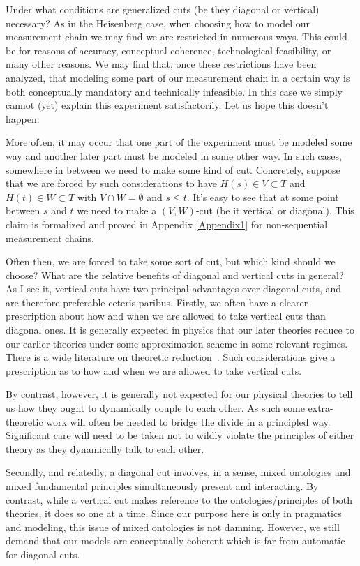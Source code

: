 \documentclass[prd,twocolumn,superscriptaddress,floatfix,amsmath,amssymb,amsfonts,nofootinbib]{revtex4-2}
\begin{document}
Under what conditions are generalized cuts (be they diagonal or vertical) necessary? As in the Heisenberg case, when choosing how to model our measurement chain we may find we are restricted in numerous ways. This could be for reasons of accuracy, conceptual coherence, technological feasibility, or many other reasons. We may find that, once these restrictions have been analyzed, that modeling some part of our measurement chain in a certain way is both conceptually mandatory and technically infeasible. In this case we simply cannot (yet) explain this experiment satisfactorily. Let us hope this doesn't happen.

More often, it may occur that one part of the experiment must be modeled some way and another later part must be modeled in some other way. In such cases, somewhere in between we need to make some kind of cut. Concretely, suppose that we are forced by such considerations to have \mbox{$H(s)\in V\subset T$} and \mbox{$H(t)\in W\subset T$} with $V\cap W=\emptyset$ and $s\leq t$. It's easy to see that at some point between $s$ and $t$ we need to make a $(V,W)$-cut (be it vertical or diagonal). This claim is formalized and proved in Appendix \ref{Appendix1} for non-sequential measurement chains.

Often then, we are forced to take some sort of cut, but which kind should we choose? What are the relative benefits of diagonal and vertical cuts in general? As I see it, vertical cuts have two principal advantages over diagonal cuts, and are therefore preferable ceteris paribus. Firstly, we often have a clearer prescription about how and when we are allowed to take vertical cuts than diagonal ones. It is generally expected in physics that our later theories reduce to our earlier theories under some approximation scheme in some relevant regimes. There is a wide literature on theoretic reduction~\cite{sep-physics-interrelate,Rosaler}. Such considerations give a prescription as to how and when we are allowed to take vertical cuts. 

By contrast, however, it is generally not expected for our physical theories to tell us how they ought to dynamically couple to each other. As such some extra-theoretic work will often be needed to bridge the divide in a principled way. Significant care will need to be taken not to wildly violate the principles of either theory as they dynamically talk to each other.

Secondly, and relatedly, a diagonal cut involves, in a sense, mixed ontologies and mixed fundamental principles simultaneously present and interacting. By contrast, while a vertical cut makes reference to the ontologies/principles of both theories, it does so one at a time. Since our purpose here is only in pragmatics and modeling, this issue of mixed ontologies is not damning. However, we still demand that our models are conceptually coherent which is far from automatic for diagonal cuts.
\end{document}
